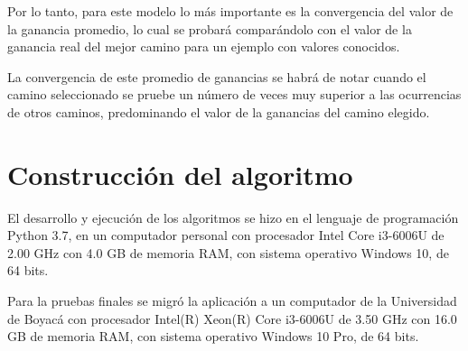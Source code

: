 Por lo tanto, para este modelo lo más importante es la convergencia del valor de la ganancia promedio, lo cual se probará comparándolo con el valor de la ganancia real del mejor camino para un ejemplo con valores conocidos.

La convergencia de este promedio de ganancias se habrá de notar cuando el camino seleccionado se pruebe un número de veces muy superior a las ocurrencias de otros caminos, predominando el valor de la ganancias del camino elegido.




\section{Construcción del algoritmo}

El desarrollo y ejecución de los algoritmos se hizo en el lenguaje de programación
Python 3.7, en un computador personal con procesador Intel Core i3-6006U de 2.00 GHz con 4.0 GB de memoria RAM, con sistema operativo Windows 10, de 64 bits.

Para la pruebas finales se migró la aplicación a un computador de la Universidad de Boyacá con procesador Intel(R) Xeon(R) Core i3-6006U de 3.50 GHz con 16.0 GB de memoria RAM, con sistema operativo Windows 10 Pro, de 64 bits.

